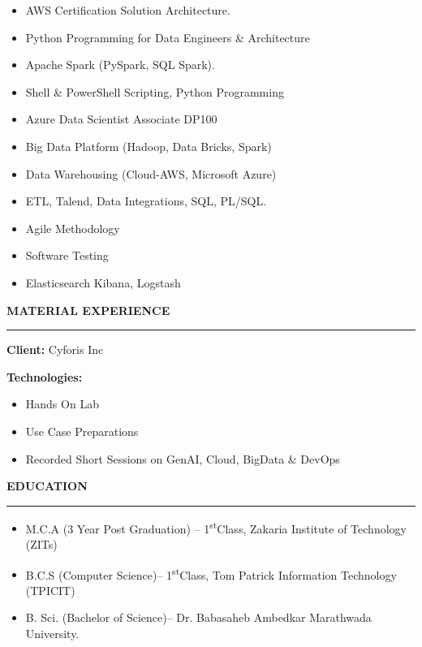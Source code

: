 \documentclass[a4paper]{article}
\begin{document}
\begin{itemize}
\item
  AWS Certification Solution Architecture.
\item
  Python Programming for Data Engineers \& Architecture
\item
  Apache Spark (PySpark, SQL Spark).
\item
  Shell \& PowerShell Scripting, Python Programming
\item
  Azure Data Scientist Associate DP100
\item
  Big Data Platform (Hadoop, Data Bricks, Spark)
\item
  Data Warehousing (Cloud-AWS, Microsoft Azure)
\item
  ETL, Talend, Data Integrations, SQL, PL/SQL.
\item
  Agile Methodology
\item
  Software Testing
\item
  Elasticsearch Kibana, Logstash
\end{itemize}

\begin{center}
  \textbf{MATERIAL EXPERIENCE}
  \rule{\textwidth}{0.4pt}  %
\end{center}

\begin{minipage}[t]{\textwidth}
  \textbf{Client:} Cyforis Inc
  \hfill
\end{minipage}

\vspace{0.2cm} %

\textbf{Technologies:}
\begin{itemize}
  \item Hands On Lab
  \item Use Case Preparations
  \item Recorded Short Sessions on GenAI, Cloud, BigData \& DevOps
\end{itemize}

\begin{center}
  \textbf{EDUCATION}
  \rule{\textwidth}{0.4pt}  %
\end{center}

\begin{itemize}
\item
  M.C.A (3 Year Post Graduation) -- 1\textsuperscript{st}Class, Zakaria
  Institute of Technology (ZITs)
\item
  B.C.S (Computer Science)-- 1\textsuperscript{st}Class, Tom Patrick
  Information Technology (TPICIT)
\item
  B. Sci. (Bachelor of Science)-- Dr. Babasaheb Ambedkar Marathwada
  University.
\end{itemize}
\end{document}
